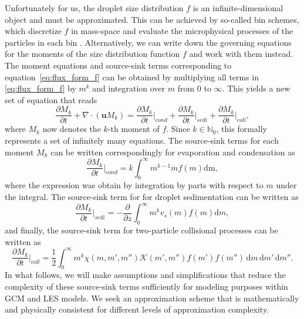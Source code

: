\documentclass{report}
\begin{document}
Unfortunately for us, the droplet size distribution $f$ is an infinite-dimensional object and must be approximated. This can be achieved by so-called bin schemes, which discretize $f$ in mass-space and evaluate the microphysical processes of the particles in each bin \citep[cf.][]{}. Alternatively, we can write down the governing equations for the moments of the size distribution function $f$ and work with them instead. The moment equations and source-sink terms corresponding to equation~\eqref{eq:flux_form_f} can be obtained by multiplying all terms in \eqref{eq:flux_form_f} by $m^k$ and integration over $m$ from $0$ to $\infty$. This yields a new set of equation that reads
\begin{equation}
    \frac{\partial M_k}{\partial t} +\nabla \cdot (\mathbf{u} M_k) = \frac{\partial M_k}{\partial  t} \biggr\rvert_{cond} + \frac{\partial M_k}{\partial t} \biggr\rvert_{sedi} + \frac{\partial M_k}{\partial t} \biggr\rvert_{coll},
\label{eq:flux_form_mom}
\end{equation}
where $M_k$ now denotes the $k$-th moment of $f$. Since $k \in \mathbb{N}_0$, this formally represents a set of infinitely many equations. The source-sink terms for each moment $M_k$ can be written correspondingly for evaporation and condensation as
\begin{equation}
    \frac{\partial M_k}{\partial t} \biggr\rvert_{cond} = k\int_0^\infty m^{k-1}\dot{m}f(m) \text{dm}, 
\label{eq:source_evap_mom}
\end{equation}
where the expression was obtain by integration by parts with respect to $m$ under the integral. The source-sink term for for droplet sedimentation can be written as
\begin{equation}
    \frac{\partial M_k}{\partial t} \biggr\rvert_{sedi} = -\frac{\partial}{\partial z}\int_0^\infty m^k v_s(m) f(m) \text{d}m,
\label{eq:source_sedi_mom}
\end{equation}
and finally, the source-sink term for two-particle collisional processes can be written as
\begin{equation}
    \frac{\partial M_k}{\partial t} \biggr\rvert_{coll} = \frac{1}{2} \int_0^\infty m^k \chi(m,m',m'') \mathcal{K}(m', m'')f(m')f(m'') \, \text{d}m\, \text{d}m' \,\text{d}{m''}.
\label{eq:source_cb_mom}
\end{equation}
In what follows, we will make assumptions and simplifications that reduce the complexity of these source-sink terms sufficiently for modeling purposes within GCM and LES models. We seek an approximation scheme that is mathematically and physically consistent for different levels of approximation complexity.
\end{document}
